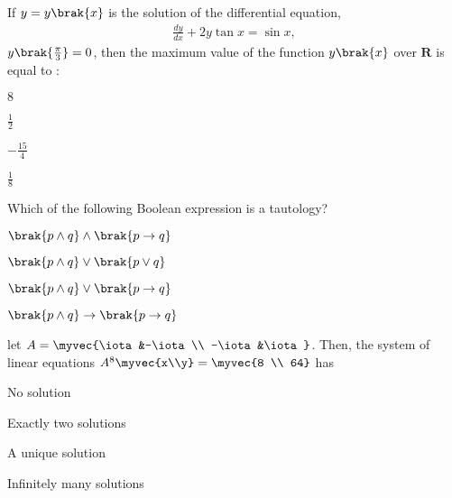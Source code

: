     \item 
    If $y = y\brak{x}$ is the solution of the differential equation, 
    \begin{align*}
        \frac{dy}{dx} + 2y\tan{x} = \sin{x},
    \end{align*} 
    $y\brak{\frac{\pi}{3}} = 0$, then the maximum value of the function $y\brak{x}$ over $\mathbf{R}$ is equal to :

    \hfill{}
    
    \begin{enumerate}
    \begin{multicols}{4}
        \item $8$
        \item $\frac{1}{2}$
        \item $-\frac{15}{4}$
        \item $\frac{1}{8}$
    \end{multicols}
    \end{enumerate}

    \item 
    Which of the following Boolean expression is a tautology?

    \hfill{}
    
    \begin{enumerate}
    \begin{multicols}{2}
        \item $\brak{p \land q} \land \brak{p \to q}$
        \item $\brak{p \land q} \lor \brak{p \lor q}$
        \item $\brak{p \land q} \lor \brak{p \to q}$
        \item $\brak{p \land q} \to \brak{p \to q}$
    \end{multicols}
    \end{enumerate}

    \item let $A = \myvec{\iota&-\iota\\ -\iota&\iota}$.
    Then, the system of linear equations $A^8\myvec{x\\y} = \myvec{8 \\ 64}$ has 

    \hfill{}
    
    \begin{enumerate}
    \begin{multicols}{2}
        \item No solution
        \item Exactly two solutions
        \item A unique solution
        \item Infinitely many solutions
    \end{multicols}
    \end{enumerate}

%
